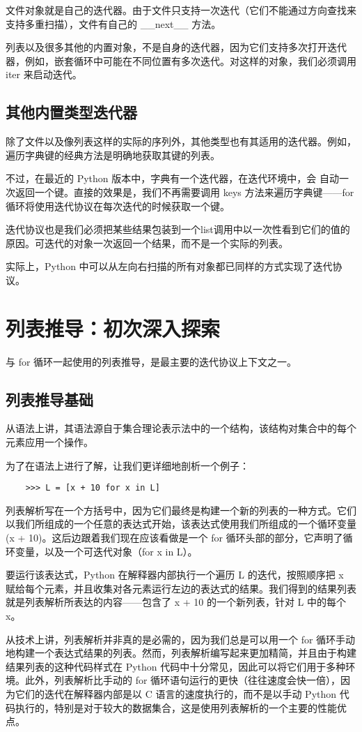 文件对象就是自己的迭代器。由于文件只支持一次迭代（它们不能通过方向查找来支持多重扫描），文件有自己的 \_\_next\_\_ 方法。

列表以及很多其他的内置对象，不是自身的迭代器，因为它们支持多次打开迭代器，例如，嵌套循环中可能在不同位置有多次迭代。对这样的对象，我们必须调用 iter 来启动迭代。
\subsection{其他内置类型迭代器}
除了文件以及像列表这样的实际的序列外，其他类型也有其适用的迭代器。例如，遍历字典键的经典方法是明确地获取其键的列表。

不过，在最近的 Python 版本中，字典有一个迭代器，在迭代环境中，会
自动一次返回一个键。直接的效果是，我们不再需要调用 keys 方法来遍历字典键——for 循环将使用迭代协议在每次迭代的时候获取一个键。

迭代协议也是我们必须把某些结果包装到一个list调用中以一次性看到它们的值的原因。可迭代的对象一次返回一个结果，而不是一个实际的列表。

实际上，Python 中可以从左向右扫描的所有对象都已同样的方式实现了迭代协议。

\section{列表推导：初次深入探索}
与 for 循环一起使用的列表推导，是最主要的迭代协议上下文之一。
\subsection{列表推导基础}
从语法上讲，其语法源自于集合理论表示法中的一个结构，该结构对集合中的每个元素应用一个操作。

为了在语法上进行了解，让我们更详细地剖析一个例子：
\begin{verbatim}
    >>> L = [x + 10 for x in L]
\end{verbatim}

列表解析写在一个方括号中，因为它们最终是构建一个新的列表的一种方式。它们以我们所组成的一个任意的表达式开始，该表达式使用我们所组成的一个循环变量(x + 10)。这后边跟着我们现在应该看做是一个 for 循环头部的部分，它声明了循环变量，以及一个可迭代对象（for x in L）。

要运行该表达式，Python 在解释器内部执行一个遍历 L 的迭代，按照顺序把 x 赋给每个元素，并且收集对各元素运行左边的表达式的结果。我们得到的结果列表就是列表解析所表达的内容——包含了 x + 10 的一个新列表，针对 L 中的每个 x。

从技术上讲，列表解析并非真的是必需的，因为我们总是可以用一个 for 循环手动地构建一个表达式结果的列表。然而，列表解析编写起来更加精简，并且由于构建结果列表的这种代码样式在 Python 代码中十分常见，因此可以将它们用于多种环境。此外，列表解析比手动的 for 循环语句运行的更快（往往速度会快一倍），因为它们的迭代在解释器内部是以 C 语言的速度执行的，而不是以手动 Python 代码执行的，特别是对于较大的数据集合，这是使用列表解析的一个主要的性能优点。

